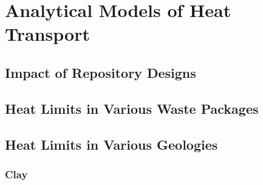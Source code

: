 
\section{Analytical Models of Heat 
Transport}\label{sec:analytical_heat}

\subsection{Impact of Repository Designs}

\subsection{Heat Limits in Various Waste Packages}



\subsection{Heat Limits in Various Geologies}

\subsubsection{Clay}
% 

